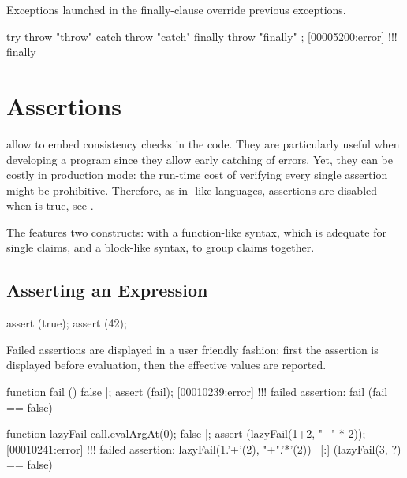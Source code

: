Exceptions launched in the finally-clause override previous exceptions.

\begin{urbiscript}
try     { throw "throw" }
catch   { throw "catch" }
finally { throw "finally" };
[00005200:error] !!! finally
\end{urbiscript}



\section{Assertions}
\label{sec:lang:assert}


 allow to embed consistency checks in the code.
They are particularly useful when developing a program since they allow
early catching of errors.  Yet, they can be costly in production mode: the
run-time cost of verifying every single assertion might be prohibitive.
Therefore, as in \langC-like languages, assertions are disabled when
 is true, see .

The  features two constructs: with a function-like syntax,
which is adequate for single claims, and a block-like syntax, to group
claims together.

\subsection{Asserting an Expression}

\begin{urbiscript}
assert (true);
assert (42);
\end{urbiscript}

Failed assertions are displayed in a user friendly fashion: first the
assertion is displayed before evaluation, then the effective values are
reported.

\begin{urbiscript}
function fail () { false }|;
assert (fail);
[00010239:error] !!! failed assertion: fail (fail == false)

function lazyFail { call.evalArgAt(0); false }|;
assert (lazyFail(1+2, "+" * 2));
[00010241:error] !!! failed assertion: lazyFail(1.'+'(2), "+".'*'(2)) \
[:]                  (lazyFail(3, ?) == false)
\end{urbiscript}

